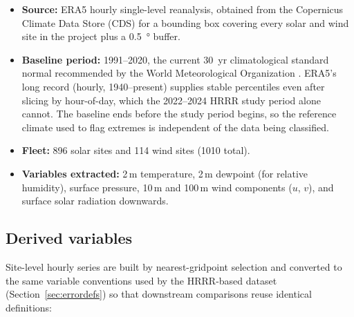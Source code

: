 \begin{itemize}
  \item \textbf{Source:} ERA5 hourly single-level reanalysis, obtained from the Copernicus
        Climate Data Store (CDS) for a bounding box covering every solar and wind site in the
        project plus a \SI{0.5}{\degree} buffer.
  \item \textbf{Baseline period:} 1991--2020, the current \SI{30}{yr} climatological standard
        normal recommended by the World Meteorological Organization \citep{wmo2017}. ERA5's long
        record (hourly, 1940--present) supplies stable percentiles even after slicing by
        hour-of-day, which the \num{2022}--\num{2024} HRRR study period alone cannot. The
        baseline ends before the study period begins, so the reference climate used to flag
        extremes is independent of the data being classified.
  \item \textbf{Fleet:} \num{896} solar sites and \num{114} wind sites (\num{1010} total).
  \item \textbf{Variables extracted:} 2\,m temperature, 2\,m dewpoint (for relative humidity),
        surface pressure, 10\,m and 100\,m wind components ($u$, $v$), and surface solar
        radiation downwards.
\end{itemize}

\subsection{Derived variables}

Site-level hourly series are built by nearest-gridpoint selection and converted to the same
variable conventions used by the HRRR-based dataset (Section~\ref{sec:errordefs}) so that
downstream comparisons reuse identical definitions:

